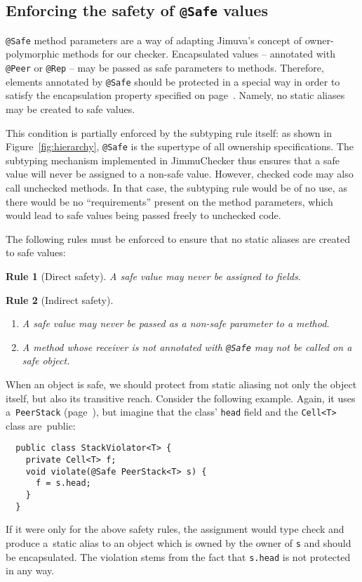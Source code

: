 \documentclass{pracamgr}
\theoremstyle{break}
\theoremstyle{break}
\theoremstyle{break}
\newtheorem{verrule}{Rule}
\begin{document}
\subsection{Enforcing the safety of \texttt{@Safe} values}
\label{sec:chk:safe}

\texttt{@Safe} method parameters are a way of adapting Jimuva's
concept of owner-polymorphic methods for our checker. Encapsulated
values -- annotated with \texttt{@Peer} or \texttt{@Rep} -- may be
passed as safe parameters to methods. Therefore, elements annotated by
\texttt{@Safe} should be protected in a special way in order to
satisfy the encapsulation property specified on
page~\pageref{inv:encap}. Namely, no static aliases may be created to
safe values.

This condition is partially enforced by the subtyping rule itself: as
shown in Figure~\ref{fig:hierarchy}, \texttt{@Safe} is the supertype
of all ownership specifications. The subtyping mechanism implemented
in JimmuChecker thus ensures that a safe value will never be assigned
to a non-safe value. However, checked code may also call unchecked
methods. In that case, the subtyping rule would be of no use, as there
would be no ``requirements'' present on the method parameters, which
would lead to safe values being passed freely to unchecked code.

The following rules must be enforced to ensure that no static aliases
are created to safe values:

\begin{verrule}[Direct safety]
  A safe value may never be assigned to fields. 
\end{verrule}
\vspace{-1cm}
\begin{verrule}[Indirect safety]
  \begin{enumerate}[label=(\arabic*)]
  \item A safe value may never be passed as a non-safe parameter to a
    method.
  \item A method whose receiver is not annotated with \texttt{@Safe}
    may not be called on a safe object.
  \end{enumerate}
\end{verrule}

When an object is safe, we should protect from static aliasing not
only the object itself, but also its transitive reach.  Consider the
following example. Again, it uses a~\texttt{PeerStack}
(page~\pageref{lst:stack-peer}), but imagine that the class'
\texttt{head} field and the \texttt{Cell<T>} class are~public:
\begin{lstlisting}
  public class StackViolator<T> {
    private Cell<T> f;
    void violate(@Safe PeerStack<T> s) {
      f = s.head;
    }
  }
\end{lstlisting}
If it were only for the above safety rules, the assignment would
type check and produce a~static alias to an object which is owned by
the owner of \texttt{s} and should be encapsulated. The violation
stems from the fact that \texttt{s.head} is not protected in any way.
\end{document}
